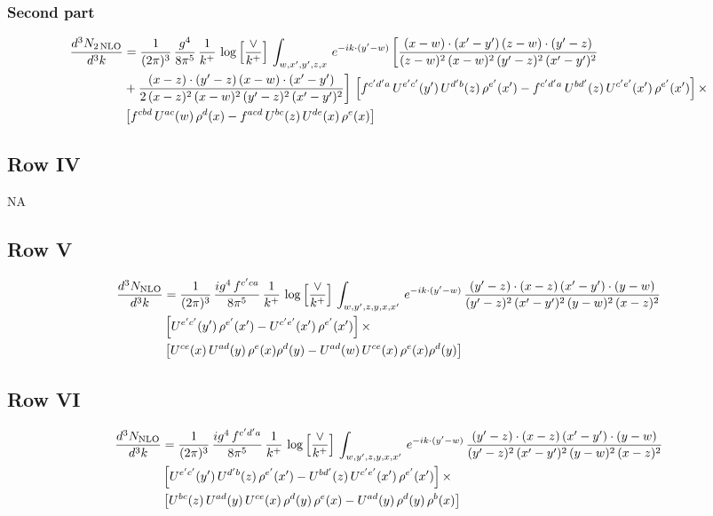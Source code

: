 \documentclass[9pt]{article}
\numberwithin{equation}{section}
\begin{document}
\subsubsection{Second part}



\begin{align}
\frac{d^{3}N_{2\,\rm NLO}}{d^{3}k} & = \frac{1}{(2\pi)^{3}}\,\frac{g^{4}}{8\pi^{5}}\,\frac{1}{k^{+}}\,\log{\left[\frac{\vee}{k^{+}}\right]}\,\int_{w,x',y',z,x}\, e^{-ik\cdot (y'-w)}\,\bigg[\frac{(x-w)\cdot (x'-y')\,(z-w)\cdot (y'-z)}{(z-w)^{2}\,(x-w)^{2}\,(y'-z)^{2}\,(x'-y')^{2}}\notag \\
& +\frac{(x-z)\cdot (y'-z)\,(x-w)\cdot (x'-y')}{2\,(x-z)^{2}\,(x-w)^{2}\,(y'-z)^{2}\,(x'-y')^{2}}\bigg]\, \left[f^{c'd'a}\,U^{e'c'}(y')\,U^{d'b}(z)\,\rho^{e'}(x')-f^{c'd'a}\, U^{bd'}(z)\,U^{c'e'}(x')\,\rho^{e'}(x')\right]\times\notag \\
& \left[f^{cbd}\,U^{ac}(w)\,\rho^{d}(x) -f^{acd}\,U^{bc}(z)\,U^{de}(x)\,\rho^{e}(x)\right]
\end{align}

\subsection{Row IV}
\textsc{NA}
\subsection{Row V}



\begin{align}
\frac{d^{3}N_{\rm NLO}}{d^{3}k} & = \frac{1}{(2\pi)^{3}}\, \frac{ig^{4}\,f^{c'ca}}{8\pi^{5}}\, \frac{1}{k^{+}}\,\log{\left[\frac{\vee}{k^{+}}\right]}\,\int_{w,y',z,y,x,x'}\, e^{-ik\cdot (y'-w)}\,\frac{(y'-z)\cdot (x-z)\,(x'-y')\cdot (y-w)}{(y'-z)^{2}\,(x'-y')^{2}\,(y-w)^{2}\,(x-z)^{2}}\notag \\
& \left[U^{e'c'}(y')\,\rho^{e'}(x')-U^{c'e'}(x')\,\rho^{e'}(x')\right]\times\notag \\
& \left[U^{ce}(x)\,U^{ad}(y)\,\rho^{e}(x)\rho^{d}(y)-U^{ad}(w)\,U^{ce}(x)\,\rho^{e}(x)\rho^{d}(y)\right]
\end{align}

\subsection{Row VI}



\begin{align}
\frac{d^{3}N_{\rm NLO}}{d^{3}k} & = \frac{1}{(2\pi)^{3}}\, \frac{ig^{4}\,f^{c'd'a}}{8\pi^{5}}\, \frac{1}{k^{+}}\,\log{\left[\frac{\vee}{k^{+}}\right]}\,\int_{w,y',z,y,x,x'}\, e^{-ik\cdot (y'-w)}\,\frac{(y'-z)\cdot (x-z)\,(x'-y')\cdot (y-w)}{(y'-z)^{2}\,(x'-y')^{2}\,(y-w)^{2}\,(x-z)^{2}}\notag \\
& \left[U^{e'c'}(y')\,U^{d'b}(z)\,\rho^{e'}(x')-U^{bd'}(z)\,U^{c'e'}(x')\,\rho^{e'}(x')\right]\times\notag \\
& \left[U^{bc}(z)\,U^{ad}(y)\,U^{ce}(x)\,\rho^{d}(y)\,\rho^{e}(x)-U^{ad}(y)\,\rho^{d}(y)\,\rho^{b}(x)\right]
\end{align}
\end{document}
